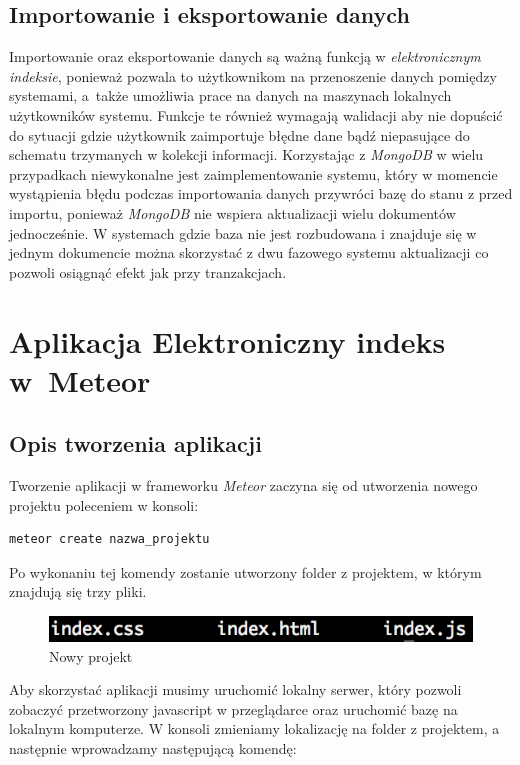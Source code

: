 \documentclass[openright]{xmgr}
\begin{document}
\section{Importowanie i eksportowanie danych}
\indent \indent \indent Importowanie oraz eksportowanie danych są ważną funkcją w \textit{elektronicznym indeksie}, ponieważ pozwala to użytkownikom na przenoszenie danych pomiędzy systemami, a~także umożliwia prace na danych na maszynach lokalnych użytkowników systemu. Funkcje te również wymagają walidacji aby nie dopuścić do sytuacji gdzie użytkownik zaimportuje błędne dane bądź niepasujące do schematu trzymanych w kolekcji informacji. Korzystając z \textit{MongoDB} w wielu przypadkach niewykonalne jest zaimplementowanie systemu, który w momencie wystąpienia błędu podczas importowania danych przywróci bazę do stanu z przed importu, ponieważ \textit{MongoDB} nie wspiera aktualizacji wielu dokumentów jednocześnie. W systemach gdzie baza nie jest rozbudowana i znajduje się w jednym dokumencie można skorzystać z dwu fazowego systemu aktualizacji co pozwoli osiągnąć efekt jak przy tranzakcjach.\cite{MongoDocs}

\chapter{Aplikacja Elektroniczny indeks w~Meteor}

\section{Opis tworzenia aplikacji}
\indent \indent \indent Tworzenie aplikacji w frameworku \textit{Meteor} zaczyna się od utworzenia nowego projektu poleceniem w konsoli:
\begin{lstlisting}[language=bash,caption={Tworzenie projektu}]
	meteor create nazwa_projektu
\end{lstlisting}

\noindent Po wykonaniu tej komendy zostanie utworzony folder z projektem, w którym znajdują się trzy pliki.

\begin{figure}[H]
\centering
\includegraphics[width=0.8\hsize]{images/newProject}
\caption{Nowy projekt\label{RYS.15}}
\end{figure}

Aby skorzystać aplikacji musimy uruchomić lokalny serwer, który pozwoli zobaczyć przetworzony javascript w przeglądarce oraz uruchomić bazę na lokalnym komputerze. W konsoli zmieniamy lokalizację na folder z projektem, a następnie wprowadzamy następującą komendę:
\end{document}
